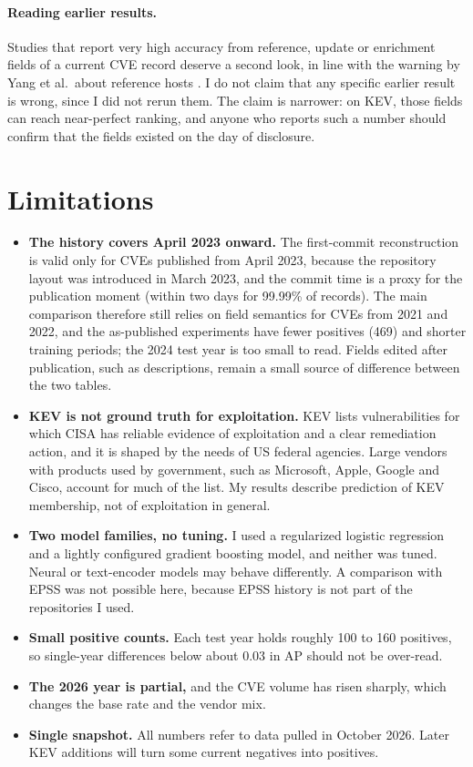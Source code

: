 \documentclass[conference,a4paper]{IEEEtran}
\begin{document}
\paragraph{Reading earlier results.} Studies that report very high accuracy from reference, update or enrichment fields of a current CVE record deserve a second look, in line with the warning by Yang et al.\ about reference hosts \cite{yang2020}. I do not claim that any specific earlier result is wrong, since I did not rerun them. The claim is narrower: on KEV, those fields can reach near-perfect ranking, and anyone who reports such a number should confirm that the fields existed on the day of disclosure.

\section{Limitations}
\label{sec:limits}

\begin{itemize}
\item \textbf{The history covers April 2023 onward.} The first-commit reconstruction is valid only for CVEs published from April 2023, because the repository layout was introduced in March 2023, and the commit time is a proxy for the publication moment (within two days for 99.99\% of records). The main comparison therefore still relies on field semantics for CVEs from 2021 and 2022, and the as-published experiments have fewer positives (469) and shorter training periods; the 2024 test year is too small to read. Fields edited after publication, such as descriptions, remain a small source of difference between the two tables.
\item \textbf{KEV is not ground truth for exploitation.} KEV lists vulnerabilities for which CISA has reliable evidence of exploitation and a clear remediation action, and it is shaped by the needs of US federal agencies. Large vendors with products used by government, such as Microsoft, Apple, Google and Cisco, account for much of the list. My results describe prediction of KEV membership, not of exploitation in general.
\item \textbf{Two model families, no tuning.} I used a regularized logistic regression and a lightly configured gradient boosting model, and neither was tuned. Neural or text-encoder models may behave differently. A comparison with EPSS was not possible here, because EPSS history is not part of the repositories I used.
\item \textbf{Small positive counts.} Each test year holds roughly 100 to 160 positives, so single-year differences below about 0.03 in AP should not be over-read.
\item \textbf{The 2026 year is partial,} and the CVE volume has risen sharply, which changes the base rate and the vendor mix.
\item \textbf{Single snapshot.} All numbers refer to data pulled in October 2026. Later KEV additions will turn some current negatives into positives.
\end{itemize}
\end{document}

